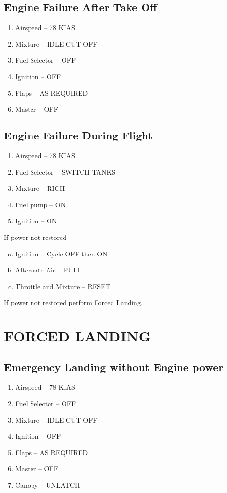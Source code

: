 \subsection{Engine Failure After Take Off}
\begin{enumerate}[(1)]
  \item Airspeed -- 78 KIAS
  \item Mixture -- IDLE CUT OFF
  \item Fuel Selector -- OFF
  \item Ignition -- OFF
  \item Flaps -- AS REQUIRED
  \item Master -- OFF
\end{enumerate}

\subsection{Engine Failure During Flight}
\begin{enumerate}[(1)]
  \item Airspeed -- 78 KIAS
  \item Fuel Selector -- SWITCH TANKS
  \item Mixture -- RICH 
  \item Fuel pump -- ON 
  \item Ignition -- ON
\end{enumerate}

  If power not restored

\begin{enumerate}[(a)]
\item Ignition  -- Cycle OFF then ON
\item Alternate Air -- PULL
\item Throttle and Mixture -- RESET
\end{enumerate}

 If power not restored perform Forced Landing.

\section{FORCED LANDING}
\subsection{Emergency Landing without Engine power}
\begin{enumerate}[(1)]
  \item Airspeed -- 78 KIAS
  \item Fuel Selector -- OFF
  \item Mixture -- IDLE CUT OFF
  \item Ignition -- OFF
  \item Flaps -- AS REQUIRED
  \item Master -- OFF
  \item Canopy -- UNLATCH
\end{enumerate}


